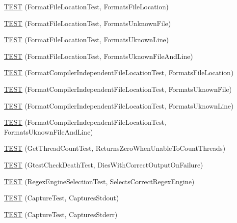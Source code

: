 \begin{DoxyCompactItemize}
\item 
\hyperlink{namespacetesting_1_1internal_a1a1c20d78e9e75b9c7f2b767eb62611b}{\-T\-E\-S\-T} (\-Format\-File\-Location\-Test, \-Formats\-File\-Location)
\item 
\hyperlink{namespacetesting_1_1internal_ace2f5407afdfb0767035d44b6758e4a0}{\-T\-E\-S\-T} (\-Format\-File\-Location\-Test, \-Formats\-Unknown\-File)
\item 
\hyperlink{namespacetesting_1_1internal_a17d1f472b6c1154de7b5b008b964ee32}{\-T\-E\-S\-T} (\-Format\-File\-Location\-Test, \-Formats\-Uknown\-Line)
\item 
\hyperlink{namespacetesting_1_1internal_a1195aaf7258c5442de7aebd95acefb9f}{\-T\-E\-S\-T} (\-Format\-File\-Location\-Test, \-Formats\-Uknown\-File\-And\-Line)
\item 
\hyperlink{namespacetesting_1_1internal_a9c12f8c1ebb19906e8fa0c430d139076}{\-T\-E\-S\-T} (\-Format\-Compiler\-Independent\-File\-Location\-Test, \-Formats\-File\-Location)
\item 
\hyperlink{namespacetesting_1_1internal_a65ad1cad17717c1b8ac4c2d4bef5e079}{\-T\-E\-S\-T} (\-Format\-Compiler\-Independent\-File\-Location\-Test, \-Formats\-Uknown\-File)
\item 
\hyperlink{namespacetesting_1_1internal_a0315a64a661f249628f2884080e0614f}{\-T\-E\-S\-T} (\-Format\-Compiler\-Independent\-File\-Location\-Test, \-Formats\-Uknown\-Line)
\item 
\hyperlink{namespacetesting_1_1internal_a8b9aee556f3dec6e67c35830ba55e0bd}{\-T\-E\-S\-T} (\-Format\-Compiler\-Independent\-File\-Location\-Test, \-Formats\-Uknown\-File\-And\-Line)
\item 
\hyperlink{namespacetesting_1_1internal_a5ad8299ae9325382f01b945f4f81711e}{\-T\-E\-S\-T} (\-Get\-Thread\-Count\-Test, \-Returns\-Zero\-When\-Unable\-To\-Count\-Threads)
\item 
\hyperlink{namespacetesting_1_1internal_afabff70df09a0e4fcda96dd36460c2b9}{\-T\-E\-S\-T} (\-Gtest\-Check\-Death\-Test, \-Dies\-With\-Correct\-Output\-On\-Failure)
\item 
\hyperlink{namespacetesting_1_1internal_a198f7132f76dd44d48dac54dc5d38fbb}{\-T\-E\-S\-T} (\-Regex\-Engine\-Selection\-Test, \-Selects\-Correct\-Regex\-Engine)
\item 
\hyperlink{namespacetesting_1_1internal_a0b658d88cea3a2fe6775b1b269c0204b}{\-T\-E\-S\-T} (\-Capture\-Test, \-Captures\-Stdout)
\item 
\hyperlink{namespacetesting_1_1internal_abbc9510a4f690912c32835213d95198f}{\-T\-E\-S\-T} (\-Capture\-Test, \-Captures\-Stderr)

\end{DoxyCompactItemize}
